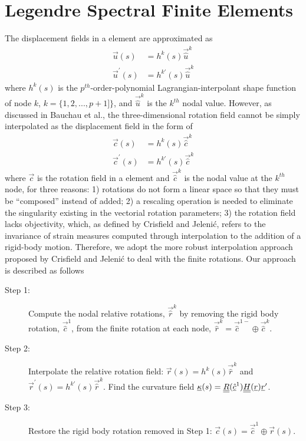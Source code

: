 \section{Legendre Spectral Finite Elements}
The displacement fields in a element are approximated as
\begin{align}
    \label{InterpolateDisp}
    \vec{u}(s) &= h^k(s) \vec{\hat{u}}^k \\
    \label{InterpolateDispp}
    \vec{u}^\prime(s) &= h^{k\prime}(s) \vec{\hat{u}}^k
\end{align}
where $h^k(s)$ is the $p^{th}$-order-polynomial
Lagrangian-interpolant shape function of node $k$, $k=\{1,2,...,p+1]\}$, 
and $\vec{\hat{u}}^k$ is
the $k^{th}$ nodal value.
However, as discussed in Bauchau et al.\cite{Bauchau-etal:2009}, the three-dimensional rotation field cannot be
simply interpolated as the displacement field in the form of
\begin{align}
    \label{InterpolateRot}
    \vec{c}(s) &= h^k(s) \vec{\hat{c}}^k \\
    \label{InterpolateRotp}
    \vec{c}^\prime(s) &= h^{k \prime}(s) \vec{\hat{c}}^k 
\end{align}    
where $\vec{c}$ is the rotation field in a element and $\vec{\hat{c}}^k$ is
the nodal value at the $k^{th}$ node, for three reasons: 1) rotations do not
form a linear space so that they must be  ``composed'' instead of added; 2)
a rescaling operation is needed to eliminate the singularity existing in the
vectorial rotation parameters; 3) the rotation field lacks objectivity,
which, as
defined by Crisfield and Jeleni\'c\cite{Crisfield1999}, refers to the
invariance of strain measures computed through interpolation to the addition
of a rigid-body motion. Therefore, we adopt the more robust interpolation
approach proposed by Crisfield and Jeleni\'c \cite{Crisfield1999} to deal
with the finite rotations. Our approach is described as follows
\begin{description}
    \item[Step 1:] Compute the nodal relative rotations, $\vec{\hat{r}}^k$ by removing the rigid body rotation, $\vec{\hat{c}}^1$, from the finite rotation at each node, $\vec{\hat{r}}^k = \vec{\hat{c}}^{1-} \oplus \vec{\hat{c}}^k$.
    \item[Step 2:] Interpolate the relative rotation field: $\vec{r}(s) = h^k(s) \vec{\hat{r}}^k$ and $\vec{r}^\prime(s) = h^{k \prime}(s) \vec{\hat{r}}^k$. Find the curvature field $\underline{\kappa}(s) = \underline{\underline{R}}(\underline{\hat{c}}^1) \underline{\underline{H}}(\underline{r}) \underline{r}^\prime$.
    \item[Step 3:] Restore the rigid body rotation removed in Step 1: $\vec{c}(s) = \vec{\hat{c}}^1 \oplus \vec{r}(s)$.
\end{description} 
